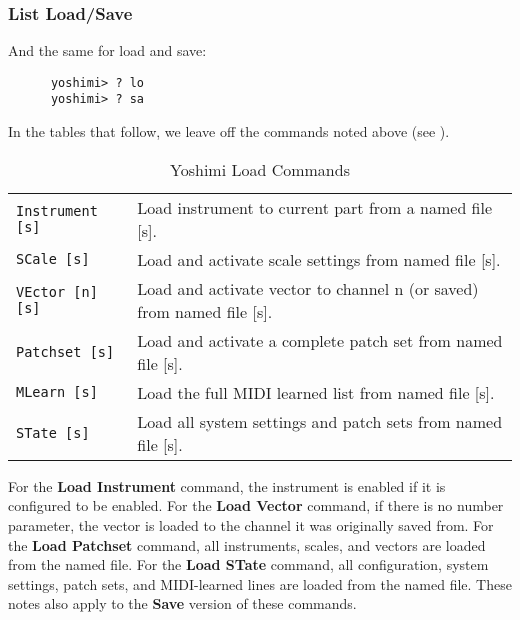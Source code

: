 \subsubsection{List Load/Save}
\label{subsec:command_line_loadsave_list}

   And the same for load and save:

   \begin{verbatim}
      yoshimi> ? lo
      yoshimi> ? sa
   \end{verbatim}

   In the tables that follow, we leave off the commands noted above
   (see ).

   \begin{table}[H]
      \centering
      \caption{Yoshimi Load Commands}
      \label{table:yoshimi_text_load_commands}
      \begin{tabular}{l l}

\texttt{Instrument [s]} &
   Load instrument to current part from a named file [s]. \\
\texttt{SCale [s]} &
   Load and activate scale settings from named file [s]. \\
\texttt{VEctor [n] [s]} &
   Load and activate vector to channel n (or saved) from named file [s]. \\
\texttt{Patchset [s]} &
   Load and activate a complete patch set from named file [s]. \\
\texttt{MLearn [s]} &
   Load the full MIDI learned list from named file [s]. \\
\texttt{STate [s]} &
   Load all system settings and patch sets from named file [s]. \\

      \end{tabular}
   \end{table}

   For the \textbf{Load Instrument} command, the instrument is enabled if it is
   configured to be enabled.  For the \textbf{Load Vector} command, if there is
   no number parameter, the vector is loaded to the channel it was originally
   saved from.
   For the \textbf{Load Patchset} command, all instruments, scales, and vectors
   are loaded from the named file.
   For the \textbf{Load STate} command, all configuration, system settings,
   patch sets, and MIDI-learned lines are loaded from the named file.
   These notes also apply to the \textbf{Save} version of these commands.

